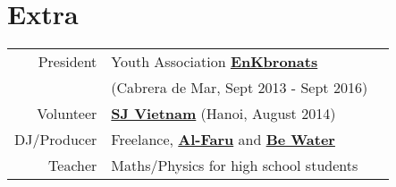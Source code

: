 \documentclass[]{deedy-resume}
\begin{document}
\begin{minipage}[t]{0.43\textwidth}
\section{Extra}

\begin{tabular}{rll}
President & Youth Association \textbf{\href{www.enkbronats.cat}{EnKbronats}} \\
& (Cabrera de Mar, Sept 2013 - Sept 2016) \\
Volunteer  & \textbf{\href{http://www.sjvietnam.org/}{SJ Vietnam}} (Hanoi, August 2014)\\
DJ/Producer & Freelance, \textbf{\href{http://www.alfaru.es/}{Al-Faru}} and \textbf{\href{http://www.bewater.cat/}{Be Water}}\\
Teacher & Maths/Physics for high school students
\end{tabular}
\sectionsep


\end{minipage}
\end{document}
